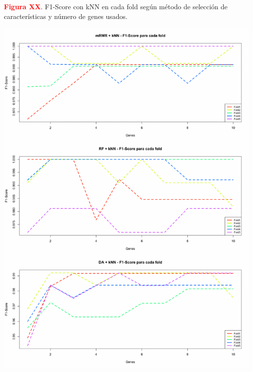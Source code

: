 \textbf{\textcolor{red}{Figura XX}}. F1-Score con kNN en cada fold según método de selección de características y número de genes usados.
\begin{center}
	\includegraphics[width=.95\textwidth]{figuras/higado_biclase_folds_f1_knn.pdf} \\
\end{center}

